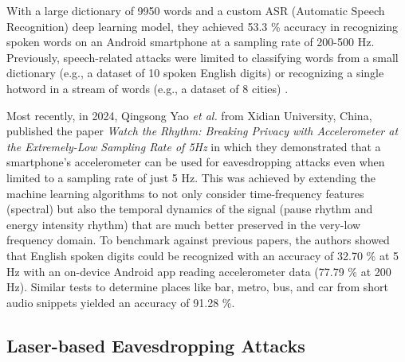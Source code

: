 \documentclass[sigconf, nonacm]{acmart}
\begin{document}
With a large dictionary of 9950 words and a custom ASR (Automatic Speech Recognition) deep learning model, they achieved 53.3 \% accuracy in recognizing spoken words on an Android smartphone at a sampling rate of 200-500 Hz.
Previously, speech-related attacks were limited to classifying words from a small dictionary (e.g., a dataset of 10 spoken English digits) \cite{Gyrophone2014}\cite{Speechless2018}\cite{InertiEAR2022}\cite{VoiceListener2023} or recognizing a single hotword in a stream of words (e.g., a dataset of 8 cities) \cite{AccelWorld2015}\cite{AccelEve2020}\cite{Vibphone2021}.

Most recently, in 2024, Qingsong Yao \textit{et al.} from Xidian University, China, published the paper \textit{Watch the Rhythm: Breaking Privacy with Accelerometer at the Extremely-Low Sampling Rate of 5Hz} \cite{WatchTheRhythm2024} in which they demonstrated that a smartphone's accelerometer can be used for eavesdropping attacks even when limited to a sampling rate of just 5 Hz.
This was achieved by extending the machine learning algorithms to not only consider time-frequency features (spectral) but also the temporal dynamics of the signal (pause rhythm and energy intensity rhythm) that are much better preserved in the very-low frequency domain.
To benchmark against previous papers, the authors showed that English spoken digits could be recognized with an accuracy of 32.70 \% at 5 Hz with an on-device Android app reading accelerometer data (77.79 \% at 200 Hz).
Similar tests to determine places like bar, metro, bus, and car from short audio snippets yielded an accuracy of 91.28 \%.

\subsection{Laser-based Eavesdropping Attacks}
\end{document}
